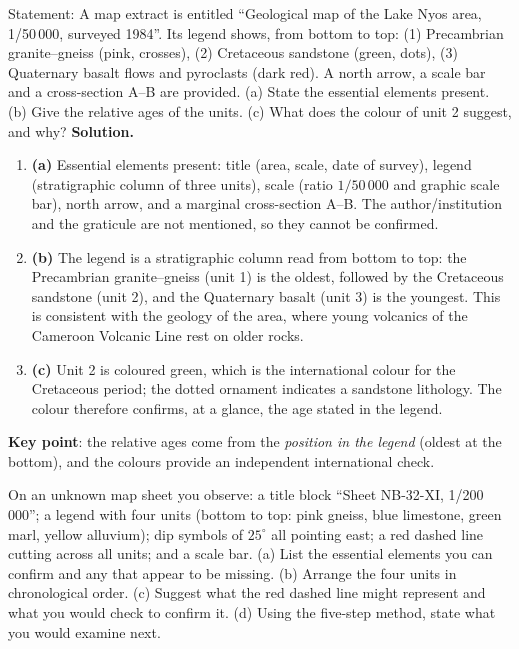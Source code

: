 \documentclass[11pt]{article}
\begin{document}
\begin{exoresolu}
Statement: A map extract is entitled ``Geological map of the Lake Nyos area, 1/50\,000, surveyed 1984''. Its legend shows, from bottom to top: (1) Precambrian granite--gneiss (pink, crosses), (2) Cretaceous sandstone (green, dots), (3) Quaternary basalt flows and pyroclasts (dark red). A north arrow, a scale bar and a cross-section A--B are provided. (a) State the essential elements present. (b) Give the relative ages of the units. (c) What does the colour of unit 2 suggest, and why?
\tcblower
\textbf{Solution.}
\begin{enumerate}
\item \textbf{(a)} Essential elements present: title (area, scale, date of survey), legend (stratigraphic column of three units), scale (ratio $1/50\,000$ and graphic scale bar), north arrow, and a marginal cross-section A--B. The author/institution and the graticule are not mentioned, so they cannot be confirmed.
\item \textbf{(b)} The legend is a stratigraphic column read from bottom to top: the Precambrian granite--gneiss (unit 1) is the oldest, followed by the Cretaceous sandstone (unit 2), and the Quaternary basalt (unit 3) is the youngest. This is consistent with the geology of the area, where young volcanics of the Cameroon Volcanic Line rest on older rocks.
\item \textbf{(c)} Unit 2 is coloured green, which is the international colour for the Cretaceous period; the dotted ornament indicates a sandstone lithology. The colour therefore confirms, at a glance, the age stated in the legend.
\end{enumerate}
\textbf{Key point}: the relative ages come from the \emph{position in the legend} (oldest at the bottom), and the colours provide an independent international check.
\end{exoresolu}

\begin{exercice}
On an unknown map sheet you observe: a title block ``Sheet NB-32-XI, 1/200\,000''; a legend with four units (bottom to top: pink gneiss, blue limestone, green marl, yellow alluvium); dip symbols of $25^{\circ}$ all pointing east; a red dashed line cutting across all units; and a scale bar. (a) List the essential elements you can confirm and any that appear to be missing. (b) Arrange the four units in chronological order. (c) Suggest what the red dashed line might represent and what you would check to confirm it. (d) Using the five-step method, state what you would examine next.
\end{exercice}
\end{document}
